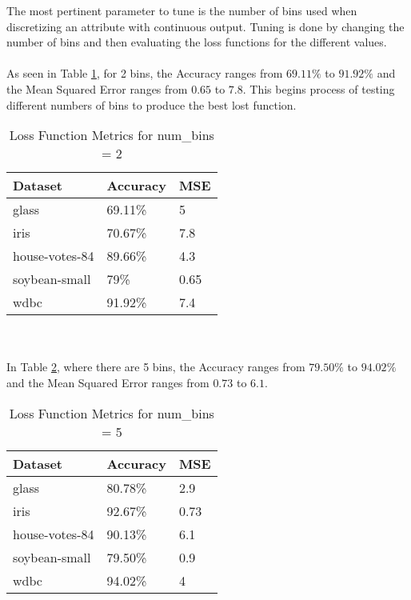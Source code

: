 \documentclass[twoside,11pt]{article}
\begin{document}
The most pertinent parameter to tune is the number of bins used when discretizing an attribute with continuous output.
Tuning is done by changing the number of bins and then evaluating the loss functions for the different values. \\\\
As seen in Table \ref{tab:metrics2}, for 2 bins, the Accuracy ranges from $69.11\%$ to $91.92\%$ and the Mean Squared Error ranges from $0.65$ to $7.8$. This begins process of testing different numbers of bins to produce the best lost function.
\begin{table}[h]
	\centering
	\caption{Loss Function Metrics for num\_bins = 2} \label{tab:metrics2}
	\begin{tabular}{|l|l|l|}
		\hline
		Dataset                  & Accuracy & MSE  \\ \hline
		glass                    & 69.11\%  & 5    \\ \hline
		iris                     & 70.67\%  & 7.8  \\ \hline
		house-votes-84           & 89.66\%  & 4.3  \\ \hline
		soybean-small            & 79\%     & 0.65 \\ \hline
		wdbc                     & 91.92\%  & 7.4  \\ \hline
	\end{tabular}
\end{table} \\\\
In Table \ref{tab:metrics5}, where there are 5 bins, the Accuracy ranges from $79.50\%$ to $94.02\%$ and the Mean Squared Error ranges from $0.73$ to $6.1$.
\begin{table}[h]
	\centering
	\caption{Loss Function Metrics for num\_bins = 5} \label{tab:metrics5}
	\begin{tabular}{|l|l|l|}
		\hline
		Dataset                  & Accuracy & MSE  \\ \hline
		glass                    & 80.78\%  & 2.9  \\ \hline
		iris                     & 92.67\%  & 0.73 \\ \hline
		house-votes-84           & 90.13\%  & 6.1  \\ \hline
		soybean-small            & 79.50\%  & 0.9  \\ \hline
		wdbc                     & 94.02\%  & 4    \\ \hline
	\end{tabular}
\end{table} \\\\
\end{document}

